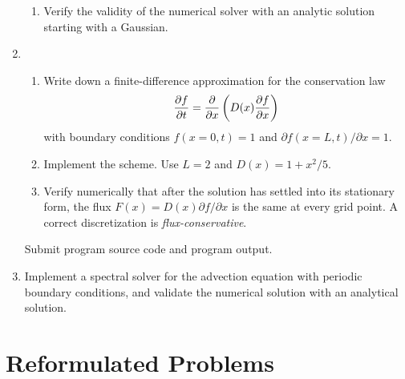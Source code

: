 \documentclass{article}
\begin{document}
\begin{enumerate}
\begin{enumerate}
\item
  Verify the validity of the numerical solver with an analytic solution starting with a Gaussian.

\end{enumerate}


\item
  \begin{enumerate}\setlength{\itemsep}{0pt}
    \item
  Write down a finite-difference approximation for the conservation law
  \[
  {\partial f \over \partial t} = {\partial \over \partial x} \left( D(x) {\partial f \over \partial x} \right) 
  \]
  with boundary conditions $f(x=0,t)=1$ and $\partial f(x=L,t)/\partial x = 1$.

  \item
    Implement the scheme. Use $L=2$ and $D(x)=1+x^2/5$.

  \item Verify numerically that after the solution has settled into its stationary form, the flux $F(x) = D(x)\partial f/\partial x$ is the same at every grid point.  A correct discretization is {\it flux-conservative}.

  \end{enumerate}
Submit program source code and program output.
  
  \item Implement a spectral solver for the advection equation with periodic boundary conditions, and validate the numerical solution with an analytical solution.


\end{enumerate}




\newpage 
\section{Reformulated Problems}
\label{chap:reform}
\end{document}
